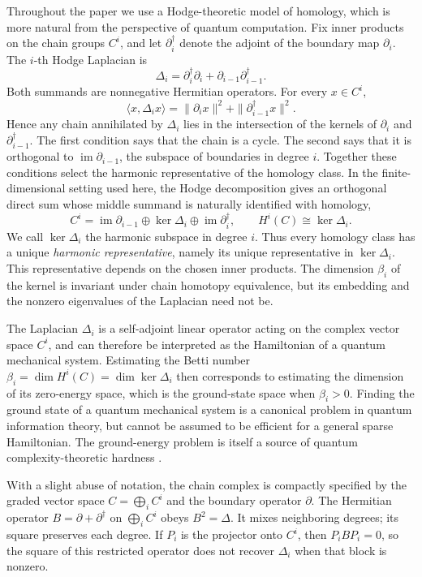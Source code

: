 \documentclass[a4paper,onecolumn,unpublished]{quantumarticle}
\theoremstyle{plain}
\theoremstyle{definition}
\theoremstyle{definition}
\numberwithin{equation}{section}
\begin{document}
Throughout the paper we use a Hodge-theoretic model of homology, which is more natural from the perspective of quantum computation. Fix inner products on the chain groups \(C^i\), and let \(\partial_i^\dagger\) denote the adjoint of the boundary map \(\partial_i\). The \(i\)-th Hodge Laplacian is
\[
 \Delta_i=\partial_i^\dagger\partial_i+
            \partial_{i-1}\partial_{i-1}^\dagger.
\]
Both summands are nonnegative Hermitian operators. For every \(x\in C^i\),
\[
 \langle x,\Delta_i x\rangle
 =\|\partial_i x\|^2+\|\partial_{i-1}^\dagger x\|^2.
\]
Hence any chain annihilated by \(\Delta_i\) lies in the intersection of the kernels of \(\partial_i\) and \(\partial_{i-1}^\dagger\). The first condition says that the chain is a cycle. The second says that it is orthogonal to \(\operatorname{im}\partial_{i-1}\), the subspace of boundaries in degree \(i\). Together these conditions select the harmonic representative of the homology class. In the finite-dimensional setting used here, the Hodge decomposition gives an orthogonal direct sum whose middle summand is naturally identified with homology,
\[
 C^i=\operatorname{im}\partial_{i-1}\oplus
       \ker\Delta_i\oplus\operatorname{im}\partial_i^\dagger,
 \qquad H^i(C)\cong\ker\Delta_i.
\]
We call \(\ker\Delta_i\) the harmonic subspace in degree \(i\). Thus every homology class has a unique \emph{harmonic representative}, namely its unique representative in \(\ker\Delta_i\). This representative depends on the chosen inner products. The dimension \(\beta_i\) of the kernel is invariant under chain homotopy equivalence, but its embedding and the nonzero eigenvalues of the Laplacian need not be.

The Laplacian \(\Delta_i\) is a self-adjoint linear operator acting on the complex vector space \(C^i\), and can therefore be interpreted as the Hamiltonian of a quantum mechanical system. Estimating the Betti number \(\beta_i=\dim H^i(C)=\dim\ker\Delta_i\) then corresponds to estimating the dimension of its zero-energy space, which is the ground-state space when \(\beta_i>0\). Finding the ground state of a quantum mechanical system is a canonical problem in quantum information theory, but cannot be assumed to be efficient for a general sparse Hamiltonian. The ground-energy problem is itself a source of quantum complexity-theoretic hardness \cite{kitaev2002classical,bookatz2012qma}.

With a slight abuse of notation, the chain complex is compactly specified by the graded vector space \(C=\bigoplus_iC^i\) and the boundary operator \(\partial\). The Hermitian operator \(B=\partial+\partial^\dagger\) on \(\bigoplus_iC^i\) obeys \(B^2=\Delta\). It mixes neighboring degrees; its square preserves each degree. If \(P_i\) is the projector onto \(C^i\), then \(P_iBP_i=0\), so the square of this restricted operator does not recover \(\Delta_i\) when that block is nonzero.
\end{document}
